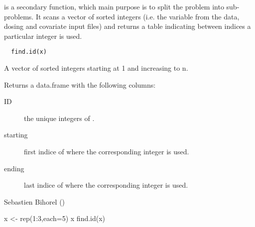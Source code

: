 %
\begin{Description}\relax
{} is a secondary function, which main purpose is to split the 
problem into sub-problems. It scans a vector of sorted integers (i.e. the
 variable from the data, dosing and covariate input files) and
returns a table indicating between indices a particular integer is used.
\end{Description}
%
\begin{Usage}
\begin{verbatim}
  find.id(x)
\end{verbatim}
\end{Usage}
%
\begin{Arguments}
\begin{ldescription}
\item[\code{x}] A vector of sorted integers starting at 1 and increasing to n.
\end{ldescription}
\end{Arguments}
%
\begin{Value}
Returns a data.frame with the following columns: \begin{description}

\item[ID] the unique integers of .
\item[starting] first indice of  where the corresponding integer is
used.
\item[ending] last indice of  where the corresponding integer is
used.

\end{description}

\end{Value}
%
\begin{Author}\relax
Sebastien Bihorel ()
\end{Author}
%
\begin{Examples}
\begin{ExampleCode}
  x <- rep(1:3,each=5)
  x
  find.id(x)
\end{ExampleCode}
\end{Examples}
